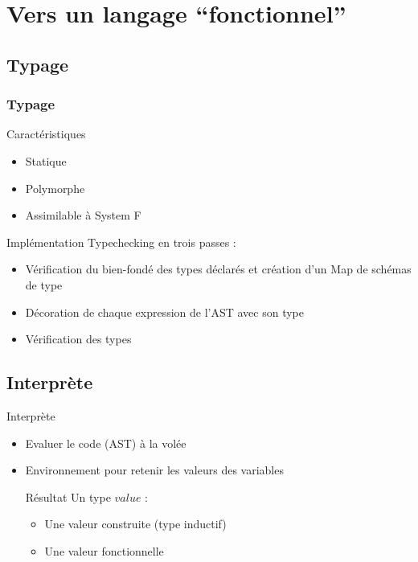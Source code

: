 \section{Vers un langage ``fonctionnel''}

\subsection{Typage}

\begin{frame}
  \frametitle{Typage}
  \begin{block}{Caractéristiques}
    \begin{itemize}
    \item Statique
    \item Polymorphe
    \item Assimilable à System F
    \end{itemize}
  \end{block}
  \begin{block}{Implémentation}
    Typechecking en trois passes :
    \begin{itemize}
      \item Vérification du bien-fondé des types déclarés et création d'un Map de schémas de type
      \item Décoration de chaque expression de l'AST avec son type
      \item Vérification des types
    \end{itemize}
  \end{block}
\end{frame}

\subsection{Interprète}

\begin{frame}{Interprète}
  \begin{itemize}
  \item Evaluer le code (AST) à la volée
  \item Environnement pour retenir les valeurs des variables
    \begin{block}{Résultat}
      Un type $value$ :
      \begin{itemize}
        \item Une valeur construite (type inductif)
        \item Une valeur fonctionnelle
      \end{itemize}
    \end{block}
  \end{itemize}
\end{frame}

